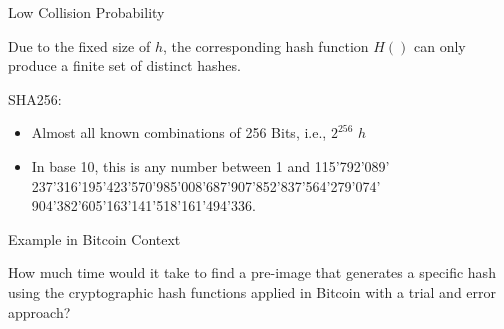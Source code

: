\documentclass[handout]{beamer}
\begin{document}
\begin{frame}{Low Collision Probability}

Due to the fixed size of $h$, the corresponding hash function $H()$ can only produce a finite set of distinct hashes.
\vspace{1em}

SHA256:
	\begin{itemize}
		\item Almost all known combinations of 256 Bits, i.e.,  $2^{256}$ $h$
		\item In base 10, this is any number between 1 and 115'792'089' 237'316'195'423'570'985'008'687'907’852'837'564'279'074' 904'382'605'163'141'518'161'494'336.
	\end{itemize}
\vspace{1em}


	
\end{frame}

\begin{frame}{Example in Bitcoin Context}

How much time would it take to find a pre-image that generates a specific hash using the cryptographic hash functions applied in Bitcoin with a trial and error approach?

\vspace{1em}

	

	
\end{frame}
\end{document}
